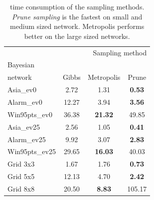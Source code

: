 \documentclass[a4paper, twoside, 11pt]{report}
\theoremstyle{plain}
\theoremstyle{definition}
\theoremstyle{remark}
\newcommand{\Ps}{\textit{Prune sampling }}
\begin{document}
\begin{center}
\begin{table}[!htb]
\begin{center}
\begin{tabular}{l c c c}  
\toprule
\multicolumn{4}{r}{Sampling method} \\
\cmidrule(r){2-4}
Bayesian \\ network    & Gibbs    & Metropolis & Prune  \\
\midrule
Asia\_ev0 & 2.72 & 1.31 & \textbf{0.53}  \\
Alarm\_ev0 & 12.27 & 3.94 & \textbf{3.56}  \\
Win95pts\_ev0 & 36.38 & \textbf{21.32} & 49.85  \\
Asia\_ev25 & 2.56 & 1.05 & \textbf{0.41}  \\
Alarm\_ev25 & 9.92 & 3.07 & \textbf{2.83}  \\
Win95pts\_ev25 & 29.65 & \textbf{16.03} & 40.03  \\
Grid 3x3 & 1.67 & 1.76 & \textbf{0.73}  \\
Grid 5x5 & 12.13 & 4.70 & \textbf{2.42}  \\
Grid 8x8 & 20.50 & \textbf{8.83} & 105.17  \\
\bottomrule
\end{tabular}
\caption{time consumption of the sampling methods. \Ps is the fastest on small and medium sized network. Metropolis performs better on the large sized networks. }
\label{ROC-table}
\end{center}
\end{table}
\end{center}

%
%
\end{document}
